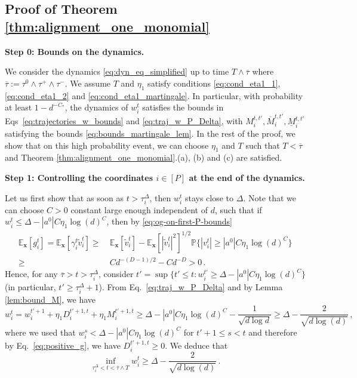 \documentclass[11pt]{article}
\renewcommand{\P}{\mathbb{P}}
\newcommand{\E}{\mathbb{E}}
\newcommand{\<}{\langle}
\renewcommand{\>}{\rangle}
\theoremstyle{definition}
\def\bx{{\boldsymbol x}}
\def\bx{{\boldsymbol x}}
\def\uM{\underline{M}}
\def\tv{\widetilde{v}}
\def\oM{\overline{M}}
\def\otau{\overline{\tau}}
\begin{document}
\subsection{Proof of Theorem \ref{thm:alignment_one_monomial}}
\label{sec:subection_Proof_prop_one_monomial}

\noindent
\textbf{Step 0: Bounds on the dynamics.} 

We consider the dynamics \eqref{eq:dyn_eq_simplified} up to time $T \wedge \otau$ where $\otau := \tau^0 \wedge \tau^+ \wedge \tau^-$. We assume $T$ and $\eta_1$ satisfy conditions \eqref{eq:cond_eta1_1}, \eqref{eq:cond_eta1_2} and \eqref{eq:cond_eta1_martingale}. In particular, with probability at least $1 - d^{-C_*}$, the dynamics of $w_i^t$ satisfies the bounds in Eqs~\eqref{eq:trajectories_w_bounds} and \eqref{eq:traj_w_P_Delta}, with $M_i^{t,t'}, \oM_i^{t,t'}, \uM_i^{t,t'}$ satisfying the bounds \eqref{eq:bounds_martingale_lem}. In the rest of the proof, we show that on this high probability event, we can choose $\eta_1$ and $T$ such that $T < \otau$ and Theorem \ref{thm:alignment_one_monomial}.(a), (b) and (c) are satisfied.



\noindent
\textbf{Step 1: Controlling the coordinates $i \in [P]$ at the end of the dynamics.}

Let us first show that as soon as $t > \tau^\Delta_i$, then $w_i^t$ stays close to $\Delta$. Note that we can choose $C > 0$ constant large enough independent of $d$, such that if $w_i^t \leq \Delta - |a^0| C \eta_1 \log(d)^C$, then by \eqref{eq:og-on-first-P-bounds}
\begin{equation}\label{eq:positive_g}
\begin{aligned}
\E_{\bx} [ g_i^t ] = \E_{\bx} [ \gamma_i^t \tv_i^t] \geq&~ \E_{\bx} [ \tv_i^t] - \E_\bx [ |\tv_i^t |^2]^{1/2}  \P\big\{| v_i^t | \geq |a^0| C \eta_1 \log(d)^C \big\} \\
\geq&~ C d^{-(D-1)/2} - C d^{-D} > 0  \, .
\end{aligned}
\end{equation}
Hence, for any $\otau > t > \tau_i^\Delta$, consider $t' = \sup \{ t' \leq t : w_i^{t'} \geq \Delta - |a^0| C \eta_1 \log(d)^C \}$ (in particular, $t' \geq \tau^\Delta_i +1 $). From Eq.~\eqref{eq:traj_w_P_Delta} and by Lemma \ref{lem:bound_M}, we have 
\[
w_i^{t} = w_i^{t' + 1} + \eta_1 D_i^{t' +1,t } + \eta_1 M_i^{t' +1,t} \geq \Delta - |a^0| C \eta_1 \log(d)^C - \frac{1}{\sqrt{d\log d}} \geq \Delta - \frac{2}{\sqrt{d\log(d)}} \, ,
\]
where we used that $w_i^s < \Delta - |a^0| C \eta_1 \log(d)^C$ for $t'+1 \leq s < t$ and therefore by Eq.~\eqref{eq:positive_g}, we have $D_i^{t' +1,t } \geq 0$. We deduce that
\begin{equation}\label{eq:lb_w_aafter_Delta}
\inf_{\tau_i^\Delta < t < \otau \wedge T} w_i^t \geq \Delta - \frac{2}{\sqrt{d \log (d)}} \, .
\end{equation}
\end{document}
